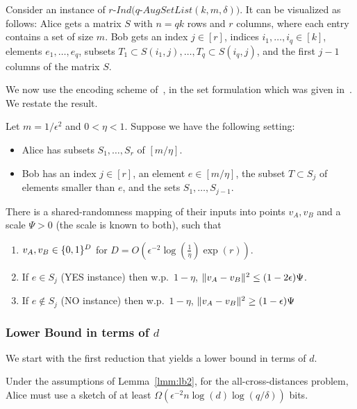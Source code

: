 Consider an instance of $r$-$Ind(q$-$AugSetList(k,m,\delta))$.
It can be visualized as follows: Alice gets a matrix $S$ with $n=qk$ rows and $r$ columns, where each entry contains a set of size $m$.
Bob gets an index $j\in[r]$, indices $i_1,\ldots,i_q\in[k]$, elements $e_1,\ldots,e_q$, subsets $T_1\subset S(i_1,j),\ldots, T_q\subset S(i_q,j)$, and the first $j-1$ columns of the matrix $S$.

We now use the encoding scheme of~\cite{jayram2013optimal}, in the set formulation which was given in~\cite{molinaro2013beating}. We restate the result.
\begin{lemma}\label{lmm:jw}
Let $m=1/\epsilon^2$ and $0<\eta<1$. Suppose we have the following setting:
\begin{itemize}
  \item Alice has subsets $S_1,\ldots,S_r$ of $[m/\eta]$.
  \item Bob has an index $j\in[r]$, an element $e\in[m/\eta]$, the subset $T\subset S_j$ of elements smaller than $e$, and the sets $S_1,\ldots,S_{j-1}$.
\end{itemize}
There is a shared-randomness mapping of their inputs into points $v_A,v_B$ and a scale $\Psi>0$ (the scale is known to both), such that
\begin{enumerate}
  \item $v_A,v_B\in\{ 0,1 \}^D$ for $D=O(\epsilon^{-2}\log(\frac1\eta)\exp(r))$.
  \item If $e\in S_j$ (YES instance) then w.p.~$1-\eta$, $\lVert v_A-v_B\rVert^2 \leq (1-2\epsilon)\Psi$.
  \item If $e\notin S_j$ (NO instance) then w.p.~$1-\eta$, $\lVert v_A-v_B\rVert^2 \geq (1-\epsilon)\Psi$
\end{enumerate}
\end{lemma}

\subsubsection{Lower Bound in terms of $d$}
We start with the first reduction that yields a lower bound in terms of $d$.
\begin{lemma}\label{lmm:lb2a}
Under the assumptions of Lemma~\ref{lmm:lb2}, for the all-cross-distances problem, Alice must use a sketch of at least $\Omega(\epsilon^{-2}n\log(d)\log(q/\delta))$ bits.
\end{lemma}

